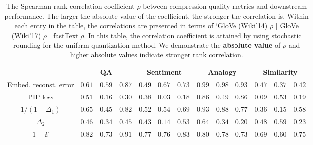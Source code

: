 \begin{table}
	\caption{The Spearman rank correlation coefficient $\rho$ between compression quality metrics and downstream performance. The larger the absolute value of the coefficient, the stronger the correlation is.
	Within each entry in the table, the correlations are presented in terms of `GloVe (Wiki'14) $\rho$ \; $|$ \; GloVe (Wiki'17) $\rho$ \; $|$ \; fastText $\rho$. In this table, the correlation coefficient is attained by using stochastic rounding for the uniform quantization method. We demonstrate the \textbf{absolute value} of $\rho$ and higher absolute values indicate stronger rank correlation.
	}
	\centering
	\small
	\begin{tabular}{c | c | c | c | c | c | c | c | c | c | c | c | c}
		\toprule
		& \multicolumn{3}{|c|}{QA} & \multicolumn{3}{|c|}{Sentiment} & \multicolumn{3}{|c|}{Analogy} & \multicolumn{3}{|c}{Similarity} \\
		\midrule
		Embed. reconst. error &  $0.61$&$0.59$&$0.87$  &  $0.49$&$0.67$&$0.73$  &  $\mathbf{0.99}$&$\mathbf{0.98}$&$\mathbf{0.93}$  &  $0.47$&$0.37$&$0.42$  \\ 
		PIP loss &  $0.51$&$0.16$&$0.30$  &  $0.38$&$0.03$&$0.18$  &  $0.86$&$0.49$&$0.86$  &  $0.09$&$0.53$&$0.19$  \\  
		$1/(1-\Delta_1)$ &  $0.65$&$0.45$&$0.82$  &  $0.52$&$0.54$&$0.69$  &  $0.93$&$0.88$&$0.77$  &  $0.36$&$0.15$&$0.58$  \\  
		$\Delta_2$ &  $0.46$&$0.34$&$0.45$  &  $0.43$&$0.14$&$0.53$  &  $0.64$&$0.34$&$0.20$  &  $0.48$&$0.59$&$0.23$  \\  
		$1 - \mathcal{E}$ & $\mathbf{0.82}$&$\mathbf{0.73}$&$\mathbf{0.91}$  &  $\mathbf{0.77}$&$\mathbf{0.76}$&$\mathbf{0.83}$  &  $0.80$&$0.78$&$0.73$  &  $\mathbf{0.69}$&$\mathbf{0.60}$&$\mathbf{0.75}$  \\  
		\bottomrule
	\end{tabular}
	\label{tab:sp_rank_stoc}
\end{table}

